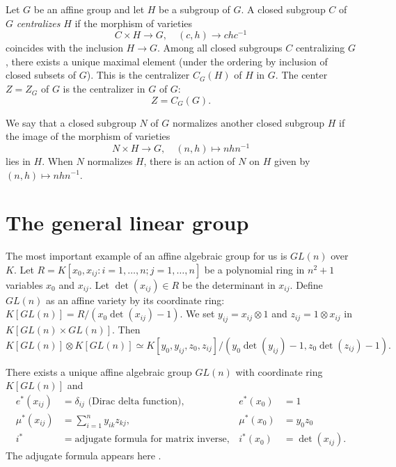 
Let $G$ be an affine group and let $H$ be a subgroup of $G$.  A closed
subgroup $C$ of $G$ {\it centralizes} $H$ if the morphism of varieties
\[
C \times H \to G, \quad (c,h)\to c h c^{-1}
\]
coincides with the inclusion $H\to G$.  Among all closed subgroups $C$
centralizing $G$, there exists a unique maximal element (under the
ordering by inclusion of closed subsets of $G$).  This is the
centralizer $C_G(H)$ of $H$ in $G$.  The center $Z = Z_G$ of $G$ is
the centralizer in $G$ of $G$:
\[
Z = C_G(G).
\]

We say that a closed subgroup $N$ of $G$ normalizes another closed
subgroup $H$ if the image of the morphism of varieties
\[
N \times H \to G,\quad (n,h) \mapsto n h n^{-1}
\]
lies in $H$.  When $N$ normalizes $H$, there is an action of
$N$ on $H$ given by $(n,h) \mapsto n h n^{-1}$.


\section{The general linear group}\label{section-general-linear-group}

The most important example of an affine algebraic group for us is
$GL(n)$ over $K$.  Let $R=K[x_0,x_{ij}:i=1,\ldots,n;j=1,\ldots,n]$ be
a polynomial ring in $n^2+1$ variables $x_0$ and $x_{ij}$.  Let
$\det(x_{ij})\in R$ be the determinant in $x_{ij}$.  Define $GL(n)$ as
an affine variety by its coordinate ring: $K[GL(n)] =
R/(x_0\det(x_{ij}) - 1)$.  We set $y_{ij} = x_{ij}\otimes 1$ and
$z_{ij} = 1\otimes x_{ij}$ in $K[GL(n)\times GL(n)]$.  Then
\[
K[GL(n)]\otimes K[GL(n)] \simeq
K[y_0,y_{ij},z_0,z_{ij}]/(y_0 \det(y_{ij})-1,z_0\det(z_{ij})-1).
\]

There exists a unique affine algebraic group $GL(n)$ with coordinate
ring $K[GL(n)]$ and
\begin{align*}
  e^*(x_{ij}) &= \delta_{ij} \text{ (Dirac delta function)},&e^*(x_0) &= 1\\
  \mu^*(x_{ij}) &= \sum_{i=1}^n {y_{ik} z_{kj}},&\mu^*(x_0) &= y_0 z_0\\
  i^* &= \text{adjugate formula for matrix inverse},&i^*(x_0)&=\det(x_{ij}).
\end{align*}
The adjugate formula appears here \cite{WA}.

